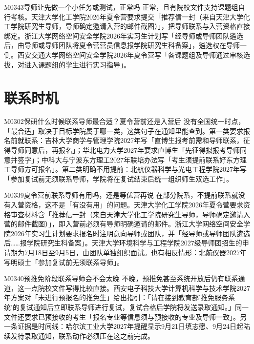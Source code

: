 \begin{qa}{M0343}{导师让先做一个小任务或测试，正常吗}
正常，且有院校文件支持课题组自行考核。天津大学化工学院2026年夏令营要求提交「推荐信一封（来自天津大学化工学院研究生导师，导师确定邀请入营的邮件截图）」，把导师联系与入营资格直接绑定。浙江大学网络空间安全学院2026年实习生计划写「经导师或导师团队遴选后，由导师或导师团队将夏令营营员信息报学院研究生科备案」，遴选权在导师一侧。西安交通大学网络空间安全学院2026年夏令营写「各课题组及导师通过审核选拔，对进入课题组的学生进行实习指导」。
\end{qa}

\section{联系时机}
\begin{qa}{M0302}{保研什么时候联系导师最合适？夏令营前还是入营后}
没有全国统一时点，「最合适」取决于目标学院属于哪一类，这类句子在通知里能查到。第一类要求报名前就联系：吉林大学商学与管理学院2027年写「直博生报考前需和导师联系，征得导师同意后，再报名」；华北电力大学2027年要求直博生「先征得拟报考导师同意并签字」；中科大与宁波东方理工2027年联培办法写「考生须提前联系好东方理工导师方可报名」。第二类明确不用提前：北航仪器科学与光电工程学院2027年写「参加复试前无须联系导师，学院将在复试结束后统一组织师生双选工作」。
\end{qa}

\begin{qa}{M0339}{夏令营前联系导师有用吗，还是等优营再说}
在部分院系，不提前联系就没有入营资格，这不是「有没有用」的问题。天津大学化工学院2026年夏令营要求资格审查材料含「推荐信一封（来自天津大学化工学院研究生导师，导师确定邀请入营的邮件截图）」，即入营前必须有导师明确邀请的邮件。浙江大学网络空间安全学院2026年实习生计划要求报名时注明意向导师或团队，并「经导师或导师团队遴选后……报学院研究生科备案」。天津大学环境科学与工程学院2027级导师团招生的申请期为7月18日至9月5日，由团队单独组织面试。也有相反情形：北航仪器2027年写明硕士「参加复试前无须联系导师」。
\end{qa}

\begin{qa}{M0340}{预推免阶段联系导师会不会太晚}
不晚，预推免甚至系统开放后仍有联系通道，这一点院校文件写得比较直接。西安电子科技大学计算机科学与技术学院2027年方案对「未进行预报名的推免生」给出指引：「请在接到教育部'推免服务系统'的复试通知后立即联系导师进行复试，复试合格后学院将发送录取通知。」同一文件还要求已预接收的考生「报名专业等信息须与预接收的专业及导师一致」。另一条证据是时间线：哈尔滨工业大学2027年提醒显示9月21日填志愿、9月24日起陆续发待录取通知，联系动作必须压在这之前完成。
\end{qa}

